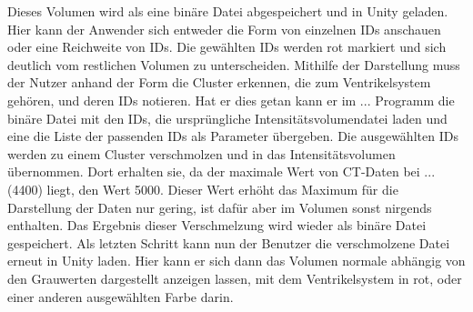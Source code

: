 \newline
Dieses Volumen wird als eine binäre Datei abgespeichert und in Unity geladen. Hier kann der Anwender sich entweder die Form von einzelnen IDs anschauen oder eine Reichweite von IDs. Die gewählten IDs werden rot markiert und sich deutlich vom restlichen Volumen zu unterscheiden. Mithilfe der Darstellung muss der Nutzer anhand der Form die Cluster erkennen, die zum Ventrikelsystem gehören, und deren IDs notieren. 
\newline
Hat er dies getan kann er im ... Programm die binäre Datei mit den IDs, die ursprüngliche Intensitätsvolumendatei laden und eine die Liste der passenden IDs als Parameter übergeben. Die ausgewählten IDs werden zu einem Cluster verschmolzen und in das Intensitätsvolumen übernommen. Dort erhalten sie, da der maximale Wert von CT-Daten bei ...(4400) liegt, den Wert 5000. Dieser Wert erhöht das Maximum für die Darstellung der Daten nur gering, ist dafür aber im Volumen sonst nirgends enthalten. Das Ergebnis dieser Verschmelzung wird wieder als binäre Datei gespeichert.
\newline
Als letzten Schritt kann nun der Benutzer die verschmolzene Datei erneut in Unity laden. Hier kann er sich dann das Volumen normale abhängig von den Grauwerten dargestellt anzeigen lassen, mit dem Ventrikelsystem in rot, oder einer anderen ausgewählten Farbe darin.
\newline
{}

